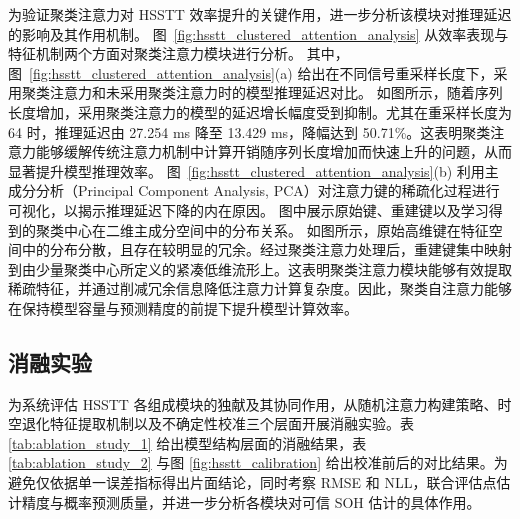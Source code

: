 为验证聚类注意力对 HSSTT 效率提升的关键作用，进一步分析该模块对推理延迟的影响及其作用机制。
% 
图~\ref{fig:hsstt_clustered_attention_analysis} 从效率表现与特征机制两个方面对聚类注意力模块进行分析。
其中，图~\ref{fig:hsstt_clustered_attention_analysis}(a) 给出在不同信号重采样长度下，采用聚类注意力和未采用聚类注意力时的模型推理延迟对比。
如图所示，随着序列长度增加，采用聚类注意力的模型的延迟增长幅度受到抑制。尤其在重采样长度为 64 时，推理延迟由 27.254 ms 降至 13.429 ms，降幅达到 50.71\%。这表明聚类注意力能够缓解传统注意力机制中计算开销随序列长度增加而快速上升的问题，从而显著提升模型推理效率。
% 
图~\ref{fig:hsstt_clustered_attention_analysis}(b) 利用主成分分析（Principal Component Analysis, PCA）对注意力键的稀疏化过程进行可视化，以揭示推理延迟下降的内在原因。
图中展示原始键、重建键以及学习得到的聚类中心在二维主成分空间中的分布关系。
如图所示，原始高维键在特征空间中的分布分散，且存在较明显的冗余。经过聚类注意力处理后，重建键集中映射到由少量聚类中心所定义的紧凑低维流形上。这表明聚类注意力模块能够有效提取稀疏特征，并通过削减冗余信息降低注意力计算复杂度。因此，聚类自注意力能够在保持模型容量与预测精度的前提下提升模型计算效率。

\subsection{消融实验}\label{subsec:HSSTT_ablation_study}

为系统评估 HSSTT 各组成模块的独献及其协同作用，从随机注意力构建策略、时空退化特征提取机制以及不确定性校准三个层面开展消融实验。表 \ref{tab:ablation_study_1} 给出模型结构层面的消融结果，表 \ref{tab:ablation_study_2} 与图 \ref{fig:hsstt_calibration} 给出校准前后的对比结果。为避免仅依据单一误差指标得出片面结论，同时考察 RMSE 和 NLL，联合评估点估计精度与概率预测质量，并进一步分析各模块对可信 SOH 估计的具体作用。

